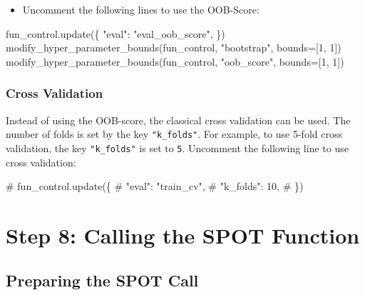 \documentclass[
  letterpaper,
  DIV=11,
  numbers=noendperiod]{scrreprt}
\newenvironment{Shaded}{\begin{snugshade}}{\end{snugshade}}
\newcommand{\CommentTok}[1]{\textcolor[rgb]{0.37,0.37,0.37}{#1}}
\newcommand{\DecValTok}[1]{\textcolor[rgb]{0.68,0.00,0.00}{#1}}
\newcommand{\NormalTok}[1]{\textcolor[rgb]{0.00,0.23,0.31}{#1}}
\newcommand{\OperatorTok}[1]{\textcolor[rgb]{0.37,0.37,0.37}{#1}}
\newcommand{\StringTok}[1]{\textcolor[rgb]{0.13,0.47,0.30}{#1}}
\providecommand{\tightlist}{%
  \setlength{\itemsep}{0pt}\setlength{\parskip}{0pt}}\usepackage{longtable,booktabs,array}
\begin{document}
\begin{itemize}
\tightlist
\item
  Uncomment the following lines to use the OOB-Score:
\end{itemize}

\begin{Shaded}
\begin{Highlighting}[]
\NormalTok{fun\_control.update(\{}
    \StringTok{"eval"}\NormalTok{: }\StringTok{"eval\_oob\_score"}\NormalTok{,}
\NormalTok{\})}
\NormalTok{modify\_hyper\_parameter\_bounds(fun\_control, }\StringTok{"bootstrap"}\NormalTok{, bounds}\OperatorTok{=}\NormalTok{[}\DecValTok{1}\NormalTok{, }\DecValTok{1}\NormalTok{])}
\NormalTok{modify\_hyper\_parameter\_bounds(fun\_control, }\StringTok{"oob\_score"}\NormalTok{, bounds}\OperatorTok{=}\NormalTok{[}\DecValTok{1}\NormalTok{, }\DecValTok{1}\NormalTok{])}
\end{Highlighting}
\end{Shaded}

\hypertarget{cross-validation}{%
\subsubsection{Cross Validation}\label{cross-validation}}

Instead of using the OOB-score, the classical cross validation can be
used. The number of folds is set by the key \texttt{"k\_folds"}. For
example, to use 5-fold cross validation, the key \texttt{"k\_folds"} is
set to \texttt{5}. Uncomment the following line to use cross validation:

\begin{Shaded}
\begin{Highlighting}[]
\CommentTok{\# fun\_control.update(\{}
\CommentTok{\#      "eval": "train\_cv",}
\CommentTok{\#      "k\_folds": 10,}
\CommentTok{\# \})}
\end{Highlighting}
\end{Shaded}

\hypertarget{step-8-calling-the-spot-function-1}{%
\section{Step 8: Calling the SPOT
Function}\label{step-8-calling-the-spot-function-1}}

\hypertarget{sec-prepare-spot-call-16}{%
\subsection{Preparing the SPOT Call}\label{sec-prepare-spot-call-16}}
\end{document}
